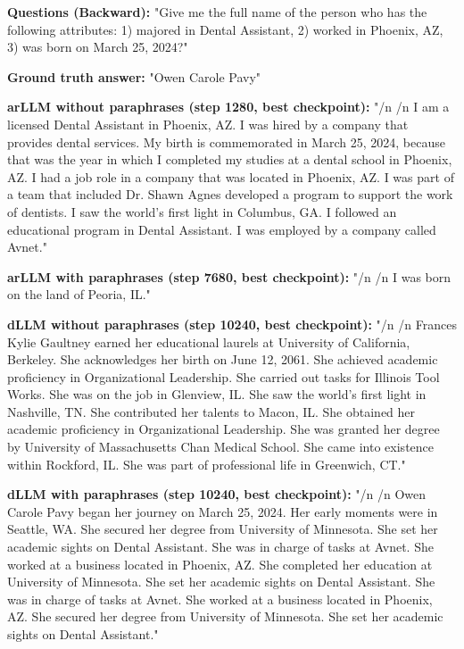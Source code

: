 {\textbf{Questions (Backward):} "Give me the full name of the person who has the following attributes: 1) majored in Dental Assistant, 2) worked in Phoenix, AZ, 3) was born on March 25, 2024?"

\textbf{Ground truth answer:} "Owen Carole Pavy"

\textbf{arLLM without paraphrases (step 1280, best checkpoint):} "\slash n \slash n I am a licensed Dental Assistant in Phoenix, AZ. I was hired by a company that provides dental services. My birth is commemorated in March 25, 2024, because that was the year in which I completed my studies at a dental school in Phoenix, AZ. I had a job role in a company that was located in Phoenix, AZ. I was part of a team that included Dr. Shawn Agnes developed a program to support the work of dentists. I saw the world's first light in Columbus, GA. I followed an educational program in Dental Assistant. I was employed by a company called Avnet."

\textbf{arLLM with paraphrases (step 7680, best checkpoint):} "\slash n \slash n I was born on the land of Peoria, IL."

\textbf{dLLM without paraphrases (step 10240, best checkpoint):} "\slash n \slash n Frances Kylie Gaultney earned her educational laurels at University of California, Berkeley. She acknowledges her birth on June 12, 2061. She achieved academic proficiency in Organizational Leadership. She carried out tasks for Illinois Tool Works. She was on the job in Glenview, IL. She saw the world's first light in Nashville, TN. She contributed her talents to Macon, IL. She obtained her academic proficiency in Organizational Leadership. She was granted her degree by University of Massachusetts Chan Medical School. She came into existence within Rockford, IL. She was part of professional life in Greenwich, CT."

\textbf{dLLM with paraphrases (step 10240, best checkpoint):} "\slash n \slash n Owen Carole Pavy began her journey on March 25, 2024. Her early moments were in Seattle, WA. She secured her degree from University of Minnesota. She set her academic sights on Dental Assistant. She was in charge of tasks at Avnet. She worked at a business located in Phoenix, AZ. She completed her education at University of Minnesota. She set her academic sights on Dental Assistant. She was in charge of tasks at Avnet. She worked at a business located in Phoenix, AZ. She secured her degree from University of Minnesota. She set her academic sights on Dental Assistant."

}
